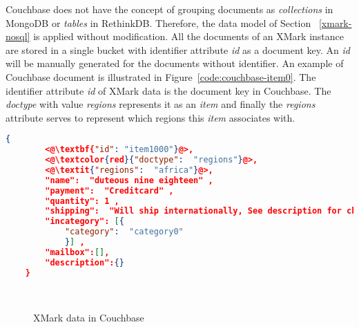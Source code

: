 Couchbase does not have the concept of grouping documents as \textit{collections} in MongoDB  or \textit{tables} in RethinkDB. 
Therefore, the data model of Section ~\ref{xmark-nosql} is applied without modification.
 All the documents of an XMark instance  are stored in a single bucket with identifier attribute \textit{id} as a document key. An \textit{id} will be manually generated for the documents without identifier.
An example of Couchbase document is illustrated in Figure~\ref{code:couchbase-item0}. The identifier attribute \textit{id}  of XMark data is the document key in Couchbase. The \textit{doctype} with  value \textit{regions} represents it as an \textit{item} and finally the \textit{regions} attribute serves to represent which regions this \textit{item} associates with.
\newbox\cbXmarkDocument
\begin{lrbox}{\cbXmarkDocument}
\begin{lstlisting}[language=JSON,  basicstyle =\scriptsize]
    {
    	<@\textbf{"id": "item1000"}@>,
    	<@\textcolor{red}{"doctype":  "regions"}@>,
    	<@\textit{"regions":  "africa"}@>,
    	"name":  "duteous nine eighteen" ,
    	"payment":  "Creditcard" ,
    	"quantity": 1 ,
    	"shipping":  "Will ship internationally, See description for charges" ,
    	"incategory": [{
    		"category":  "category0"
    		}] ,
    	"mailbox":[],
    	"description":{}
    }
\end{lstlisting} 
\end{lrbox}


\newbox\cbXmarkChart
\begin{lrbox}{\cbXmarkChart}
\end{lrbox}

\begin{figure}[hbtp]
\centering
{}
\\
\centering
{}

\caption{XMark data in Couchbase}
\label{xmark-cb-figure}
\end{figure}